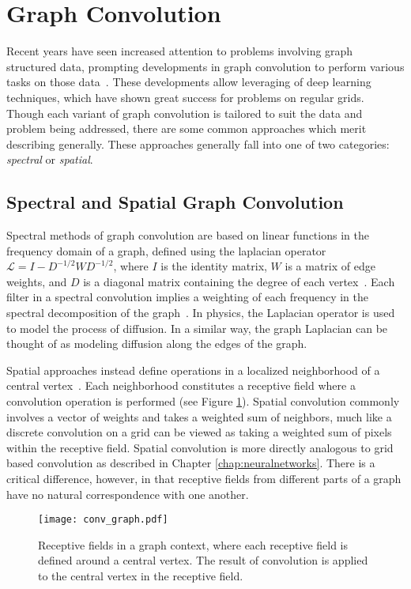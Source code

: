 \section{Graph Convolution}
Recent years have seen increased attention to problems involving graph structured data, prompting developments in graph convolution to perform various tasks on those data~\cite{bronstein2016}.
These developments allow leveraging of deep learning techniques, which have shown great success for problems on regular grids.
Though each variant of graph convolution is tailored to suit the data and problem being addressed, there are some common approaches which merit describing generally.
These approaches generally fall into one of two categories: \emph{spectral} or \emph{spatial}.


\subsection{Spectral and Spatial Graph Convolution}
Spectral methods of graph convolution are based on linear functions in the frequency domain of a graph, defined using the laplacian operator $\mathcal{L}=I-D^{-1/2}WD^{-1/2}$, where $I$ is the identity matrix, $W$ is a matrix of edge weights, and $D$ is a diagonal matrix containing the degree of each vertex~\cite{bruna2013, henaff2015, kipf2016}.
Each filter in a spectral convolution implies a weighting of each frequency in the spectral decomposition of the graph~\cite{mallat2009}.
In physics, the Laplacian operator is used to model the process of diffusion.
In a similar way, the graph Laplacian can be thought of as modeling diffusion along the edges of the graph.

Spatial approaches instead define operations in a localized neighborhood of a central vertex~\cite{henaff2015, atwood2016}.
Each neighborhood constitutes a receptive field where a convolution operation is performed (see Figure \ref{fig:spatial_graph_conv}).
Spatial convolution commonly involves a vector of weights and takes a weighted sum of neighbors, much like a discrete convolution on a grid can be viewed as taking a weighted sum of pixels within the receptive field.
Spatial convolution is more directly analogous to grid based convolution as described in Chapter \ref{chap:neuralnetworks}.
There is a critical difference, however, in that receptive fields from different parts of a graph have no natural correspondence with one another.

\begin{figure}
	\centering
	\texttt{[image: conv\_graph.pdf]}
	\caption{Receptive fields in a graph context, where each receptive field is defined around a central vertex. The result of convolution is applied to the central vertex in the receptive field.}
	\label{fig:spatial_graph_conv}
\end{figure}

